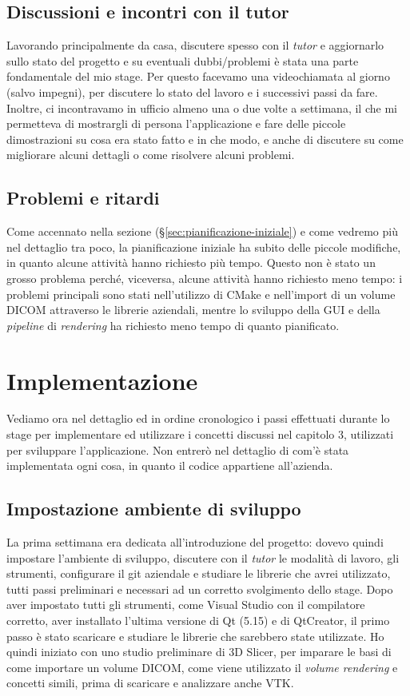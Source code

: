 \subsection{Discussioni e incontri con il tutor}
Lavorando principalmente da casa, discutere spesso con il \emph{tutor} e aggiornarlo sullo stato del progetto e su eventuali dubbi/problemi è stata una parte fondamentale del mio stage. Per questo facevamo una videochiamata al giorno (salvo impegni), per discutere lo stato del lavoro e i successivi passi da fare. Inoltre, ci incontravamo in ufficio almeno una o due volte a settimana, il che mi permetteva di mostrargli di persona l'applicazione e fare delle piccole dimostrazioni su cosa era stato fatto e in che modo, e anche di discutere su come migliorare alcuni dettagli o come risolvere alcuni problemi.

\subsection{Problemi e ritardi}\label{sec:problemi-ritardi}
Come accennato nella sezione  (§\ref{sec:pianificazione-iniziale}) e come vedremo più nel dettaglio tra poco, la pianificazione iniziale ha subito delle piccole modifiche, in quanto alcune attività hanno richiesto più tempo. Questo non è stato un grosso problema perché, viceversa, alcune attività hanno richiesto meno tempo: i problemi principali sono stati nell'utilizzo di CMake e nell'import di un volume DICOM attraverso le librerie aziendali, mentre lo sviluppo della GUI e della \emph{pipeline} di \emph{rendering} ha richiesto meno tempo di quanto pianificato.

\section{Implementazione}
Vediamo ora nel dettaglio ed in ordine cronologico i passi effettuati durante lo stage per implementare ed utilizzare i concetti discussi nel capitolo 3, utilizzati per sviluppare l'applicazione. Non entrerò nel dettaglio di com'è stata implementata ogni cosa, in quanto il codice appartiene all'azienda.

\subsection{Impostazione ambiente di sviluppo}
La prima settimana era dedicata all'introduzione del progetto: dovevo quindi impostare l'ambiente di sviluppo, discutere con il \emph{tutor} le modalità di lavoro, gli strumenti, configurare il git aziendale e studiare le librerie che avrei utilizzato, tutti passi preliminari e necessari ad un corretto svolgimento dello stage.
Dopo aver impostato tutti gli strumenti, come Visual Studio con il compilatore corretto, aver installato l'ultima versione di Qt (5.15) e di QtCreator, il primo passo è stato scaricare e studiare le librerie che sarebbero state utilizzate. Ho quindi iniziato con uno studio preliminare di 3D Slicer, per imparare le basi di come importare un volume DICOM, come viene utilizzato il \emph{volume rendering} e concetti simili, prima di scaricare e analizzare anche VTK. 

